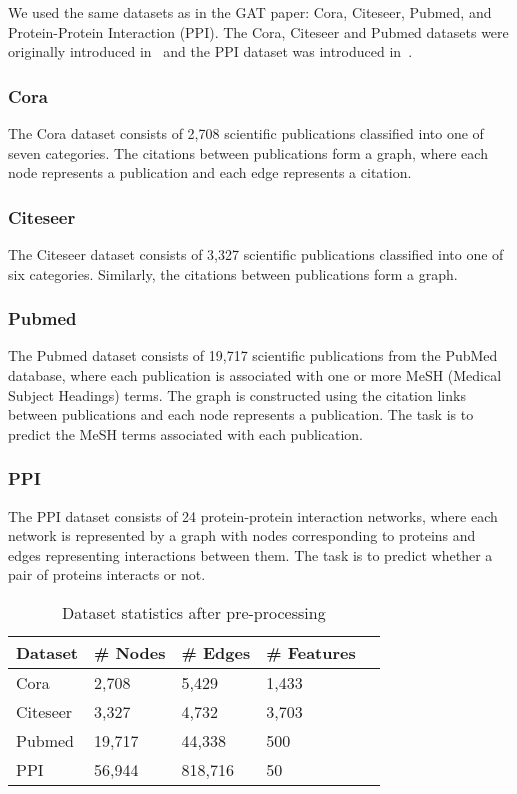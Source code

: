 We used the same datasets as in the GAT paper: Cora, Citeseer, Pubmed, and Protein-Protein Interaction (PPI).
The Cora, Citeseer and Pubmed datasets were originally introduced in~\cite{sen2008collective} and the PPI dataset was
introduced in~\cite{hamilton2017inductive}.

\subsubsection{Cora}
The Cora dataset consists of 2,708 scientific publications classified into one of seven categories.
The citations between publications form a graph, where each node represents a publication and each edge represents a citation.

\subsubsection{Citeseer}
The Citeseer dataset consists of 3,327 scientific publications classified into one of six categories.
Similarly, the citations between publications form a graph.

\subsubsection{Pubmed}
The Pubmed dataset consists of 19,717 scientific publications from the PubMed database, where each publication is associated with one or more MeSH (Medical Subject Headings) terms.
The graph is constructed using the citation links between publications and each node represents a publication.
The task is to predict the MeSH terms associated with each publication.

\subsubsection{PPI}
The PPI dataset consists of 24 protein-protein interaction networks, where each network is represented by a graph with nodes corresponding to proteins and edges representing interactions between them.
The task is to predict whether a pair of proteins interacts or not.

\begin{table}
    \centering
    \begin{tabular}{@{}lllll@{}}
        \toprule
        \textbf{Dataset} & \textbf{\# Nodes} & \textbf{\# Edges} & \textbf{\# Features} \\
        \midrule
        Cora & 2,708 & 5,429 & 1,433 \\
        Citeseer & 3,327 & 4,732 & 3,703 \\
        Pubmed & 19,717 & 44,338 & 500 \\
        PPI & 56,944 & 818,716 & 50 \\
        \bottomrule
    \end{tabular}
    \caption{Dataset statistics after pre-processing}
    \label{tab:dataset_stats}

\end{table}


